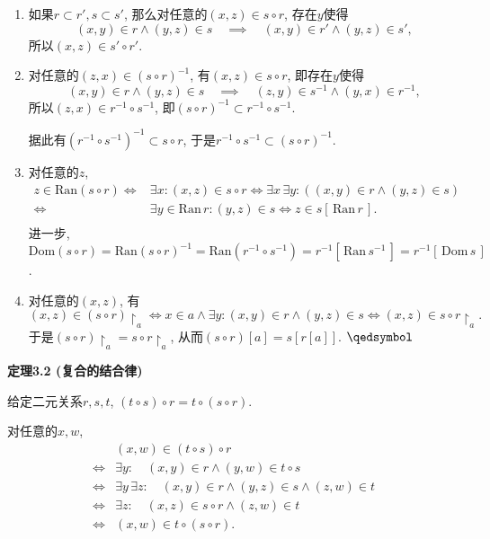 \begin{enumerate}
    \item 如果$r\subset r',s\subset s'$, 那么对任意的$(x,z)\in s\circ r$,
    存在$y$使得
    \[
        (x,y)\in r\land(y,z)\in s\quad\implies\quad
        (x,y)\in r'\land(y,z)\in s',
    \]
    所以$(x,z)\in s'\circ r'$.

    \item 对任意的$(z,x)\in(s\circ r)^{-1}$, 有$(x,z)\in s\circ r$,
    即存在$y$使得
    \[
        (x,y)\in r\land(y,z)\in s\quad\implies\quad
        (z,y)\in s^{-1}\land(y,x)\in r^{-1},
    \]
    所以$(z,x)\in r^{-1}\circ s^{-1}$,
    即$(s\circ r)^{-1}\subset r^{-1}\circ s^{-1}$.

    \hspace{2.17em}
    据此有$(r^{-1}\circ s^{-1})^{-1}\subset s\circ r$,
    于是$r^{-1}\circ s^{-1}\subset(s\circ r)^{-1}$.

    \item 对任意的$z$,
    \[\begin{aligned}
        z\in\mathrm{Ran}(s\circ r)\iff&\exists x:(x,z)\in s\circ r\iff
        \exists x\,\exists y:((x,y)\in r\land(y,z)\in s)\\[-3pt]
        \iff&\exists y\in\mathrm{Ran}\,r:(y,z)\in s\iff
        z\in s[\,\mathrm{Ran}\,r\,].\\[1pt]
    \end{aligned}\]
    进一步, $\mathrm{Dom}(s\circ r)=\mathrm{Ran}(s\circ r)^{-1}=
    \mathrm{Ran}(r^{-1}\circ s^{-1})=r^{-1}[\,\mathrm{Ran}\,s^{-1}\,]=
    r^{-1}[\,\mathrm{Dom}\,s\,]$.

    \item 对任意的$(x,z)$, 有
    \[
        (x,z)\in(s\circ r)\!\restriction_a\iff
        x\in a\land\exists y:(x,y)\in r\land(y,z)\in s\iff
        (x,z)\in s\circ r\!\restriction_a.
    \]
    于是$(s\circ r)\!\restriction_a=s\circ r\!\restriction_a$,
    从而$(s\circ r)[a]=s[r[a]]$. \hfill $\qedsymbol$
\end{enumerate}

\vspace{10pt}

\hypertarget{sec:定理3.2}{}
\noindent\textbf{定理3.2 (复合的结合律)}

给定二元关系$r,s,t$, $(t\circ s)\circ r=t\circ(s\circ r)$.


对任意的$x,w$,
\begin{equation*}\begin{aligned}
    &(x,w)\in(t\circ s)\circ r\\
    \iff&\exists y:\quad(x,y)\in r\land(y,w)\in t\circ s\\
    \iff&\exists y\,\exists z:\quad(x,y)\in r\land(y,z)\in s\land(z,w)\in t\\
    \iff&\exists z:\quad(x,z)\in s\circ r\land(z,w)\in t\\
    \iff&(x,w)\in t\circ(s\circ r).
\end{aligned}\tag*{\qedsymbol}\end{equation*}

